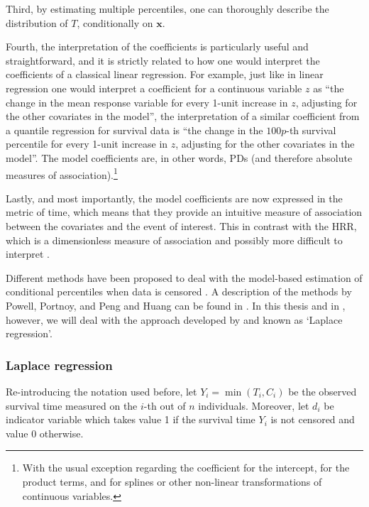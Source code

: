 Third, by estimating multiple percentiles, one can thoroughly describe the distribution of $T$, conditionally on $\mathbf{x}$.

Fourth, the interpretation of the coefficients is particularly useful and straightforward, and it is strictly related to how one would interpret the coefficients of a classical linear regression. For example, just like in linear regression one would interpret a coefficient for a continuous variable $z$ as ``the change in the mean response variable for every 1-unit increase in $z$, adjusting for the other covariates in the model'', the interpretation of a similar coefficient from a quantile regression for survival data is ``the change in the $100p$-th survival percentile for every 1-unit increase in $z$, adjusting for the other covariates in the model''. The model coefficients are, in other words, PDs (and therefore absolute measures of association).\footnote{With the usual exception regarding the coefficient for the intercept, for the product terms, and for splines or other non-linear transformations of continuous variables.} 

Lastly, and most importantly, the model coefficients are now expressed in the metric of time, which means that they provide an intuitive measure of association between the covariates and the event of interest. This in contrast with the HRR, which is a dimensionless measure of association and possibly more difficult to interpret \citep{uno_moving_2014}.

Different methods have been proposed to deal with the model-based estimation of conditional percentiles when data is censored \citep{powell_censored_1986, portnoy_censored_2003, peng_survival_2008, wang_locally_2009, bottai_laplace_2010}. A description of the methods by Powell, Portnoy, and Peng and Huang can be found in \citet{koenker_censored_2008}. In this thesis and in , however, we will deal with the approach developed by \citet{bottai_laplace_2010} and known as `Laplace regression'.


\subsubsection{Laplace regression}

Re-introducing the notation used before, let $Y_i=\min(T_i,C_i)$ be the observed survival time measured on the $i$-th out of $n$ individuals. Moreover, let $d_i$ be indicator variable which takes value 1 if the survival time $Y_i$ is not censored and value 0 otherwise.

